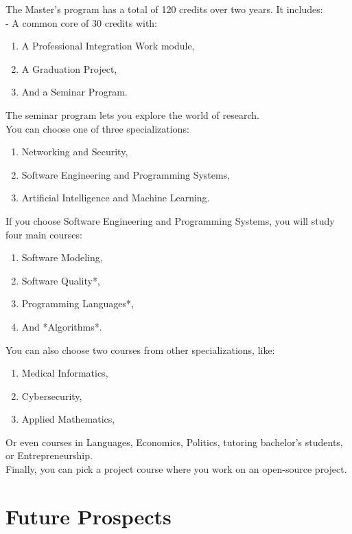 \documentclass{article}
\begin{document}
The Master’s program has a total of 120 credits over two years. It includes:  \\
- A common core of 30 credits with:
\begin{enumerate} 
   \item A Professional Integration Work module,  
   \item A Graduation Project,  
    \item And a Seminar Program.  
\end{enumerate}
The seminar program lets you explore the world of research. \\
You can choose one of three specializations:  \\
\begin{enumerate} 
   \item Networking and Security,  
    \item Software Engineering and Programming Systems,  
   \item Artificial Intelligence and Machine Learning.  
\end{enumerate}
If you choose Software Engineering and Programming Systems, you will study four main courses: \\ 
\begin{enumerate} 
  \item Software Modeling,  
   \item Software Quality*,  
   \item Programming Languages*,  
    \item And *Algorithms*.  
\end{enumerate}

You can also choose two courses from other specializations, like: \\
\begin{enumerate} 
 \item Medical Informatics,  
  \item Cybersecurity,  
  \item Applied Mathematics, 
\end{enumerate}
Or even courses in Languages, Economics, Politics, tutoring bachelor’s students, 
or Entrepreneurship.  \\

Finally, you can pick a project course where you work on an open-source project.

\section{Future Prospects}
\end{document}
